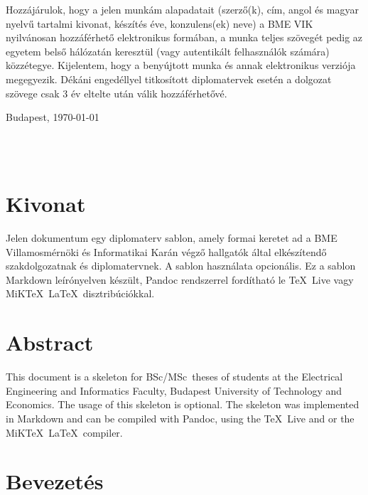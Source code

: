 \documentclass[11pt,magyar,a4paper,oneside,]{report}
\begin{document}
Hozzájárulok, hogy a jelen munkám alapadatait (szerző(k), cím, angol és magyar nyelvű tartalmi kivonat, készítés éve, konzulens(ek) neve) a BME VIK nyilvánosan hozzáférhető elektronikus formában, a munka teljes szövegét pedig az egyetem belső hálózatán keresztül (vagy autentikált felhasználók számára) közzétegye. Kijelentem, hogy a benyújtott munka és annak elektronikus verziója megegyezik. Dékáni engedéllyel titkosított diplomatervek esetén a dolgozat szövege csak 3 év eltelte után válik hozzáférhetővé.

\begin{flushleft}
\vspace*{1cm}
Budapest, \today
\end{flushleft}

\begin{flushright}
 \vspace*{1cm}
 \makebox[7cm]{\rule{6cm}{.4pt}}\\
 \\
\end{flushright}
\thispagestyle{empty}

\vfill
\clearpage
\thispagestyle{empty} %

\chapter*{Kivonat}\label{kivonat}

Jelen dokumentum egy diplomaterv sablon, amely formai keretet ad a BME
Villamosmérnöki és Informatikai Karán végző hallgatók által elkészítendő
szakdolgozatnak és diplomatervnek. A sablon használata opcionális. Ez a
sablon Markdown leírónyelven készült, Pandoc rendszerrel fordítható le
\TeX~Live vagy MiK\TeX~\LaTeX~disztribúciókkal.

\chapter*{Abstract}\label{abstract}

This document is a skeleton for BSc/MSc~theses of students at the
Electrical Engineering and Informatics Faculty, Budapest University of
Technology and Economics. The usage of this skeleton is optional. The
skeleton was implemented in Markdown and can be compiled with Pandoc,
using the \TeX~Live and or the MiK\TeX~\LaTeX~compiler.

\chapter{Bevezetés}\label{bevezetuxe9s}
\end{document}

